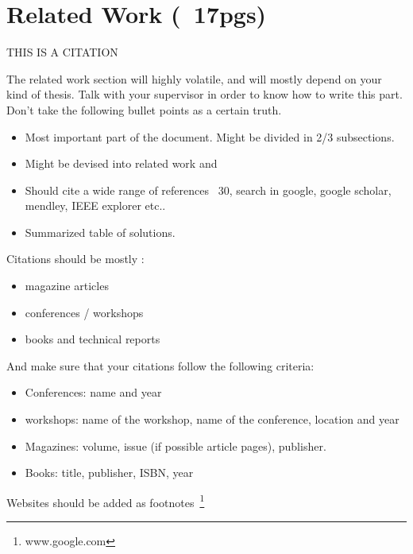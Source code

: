 
% 
% 

\section{Related Work (~17pgs)}

THIS IS A CITATION\cite{Braem2013a}

The related work section will highly volatile, and will mostly depend on your kind of thesis. Talk with your supervisor in order to know how to write this part. Don't take the following bullet points as a certain truth.

\begin{itemize}
  \item Most important part of the document. Might be divided in 2/3 subsections.
  \item Might be devised into related work and 
  \item Should cite a wide range of references ~30, search in google, google scholar, mendley, IEEE explorer etc..
  \item Summarized table of solutions.
\end{itemize}

Citations should be mostly :
\begin{itemize}
  \item magazine articles
  \item conferences / workshops
  \item books and technical reports
\end{itemize}
And make sure that your citations follow the following criteria:
\begin{itemize}
  \item Conferences: name and year
  \item workshops: name of the workshop, name of the conference, location and year
  \item Magazines: volume, issue (if possible article pages), publisher.
  \item Books: title, publisher, ISBN, year
\end{itemize}
Websites should be added as footnotes~\footnote{www.google.com}

